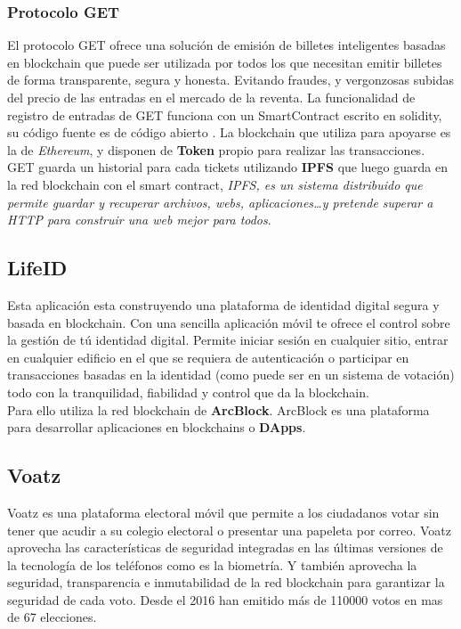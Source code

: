 \subsubsection{Protocolo GET}

El protocolo GET ofrece una solución de emisión de billetes inteligentes basadas en blockchain que puede ser utilizada por todos los que necesitan emitir billetes de forma transparente, segura y honesta. Evitando fraudes, y vergonzosas subidas del precio de las entradas en el mercado de la reventa. La funcionalidad de registro de entradas de GET funciona con un SmartContract escrito en solidity, su código fuente es de código abierto \cite{srcGET}. La blockchain que utiliza para apoyarse es la de \emph{Ethereum}, y disponen de \textbf{Token} propio para realizar las transacciones\cite{tokGET}. GET guarda un historial para cada tickets utilizando \textbf{IPFS}\cite{IPFS} que luego guarda en la red blockchain con el smart contract, \textit{IPFS, es un sistema distribuido que permite guardar y recuperar archivos, webs, aplicaciones\dots y pretende superar a HTTP para construir una web mejor para todos}.

\subsection{LifeID}

Esta aplicación esta construyendo una plataforma de identidad digital segura y basada en blockchain. Con una sencilla aplicación móvil te ofrece el control sobre la gestión de tú identidad digital. Permite iniciar sesión en cualquier sitio, entrar en cualquier edificio en el que se requiera de autenticación o participar en transacciones basadas en la identidad (como puede ser en un sistema de votación) todo con la tranquilidad, fiabilidad y control que da la blockchain. \\ 

Para ello utiliza la red blockchain de \textbf{ArcBlock}\cite{webArc,alianzaArc}. ArcBlock es una plataforma para desarrollar aplicaciones en blockchains o \textbf{DApps}\cite{dapps}. 

\clearpage
\subsection{Voatz}

Voatz es una plataforma electoral móvil que permite a los ciudadanos votar sin tener que acudir a su colegio electoral o presentar una papeleta por correo. Voatz aprovecha las características de seguridad integradas en las últimas versiones de la tecnología de los teléfonos como es la biometría. Y también aprovecha la seguridad, transparencia e inmutabilidad de la red blockchain para garantizar la seguridad de cada voto. Desde el 2016 han emitido más de 110000 votos en mas de 67 elecciones. 


